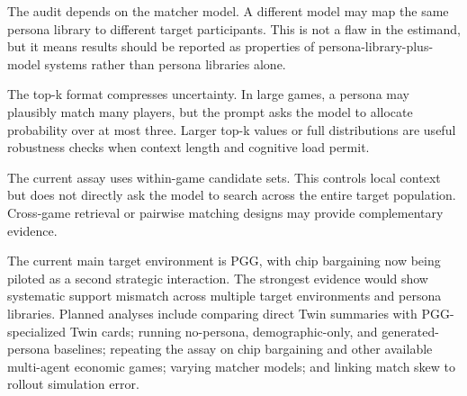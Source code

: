 \documentclass[11pt]{article}
\begin{document}
The audit depends on the matcher model. A different model may map the same persona library to different target participants. This is not a flaw in the estimand, but it means results should be reported as properties of persona-library-plus-model systems rather than persona libraries alone.

The top-k format compresses uncertainty. In large games, a persona may plausibly match many players, but the prompt asks the model to allocate probability over at most three. Larger top-k values or full distributions are useful robustness checks when context length and cognitive load permit.

The current assay uses within-game candidate sets. This controls local context but does not directly ask the model to search across the entire target population. Cross-game retrieval or pairwise matching designs may provide complementary evidence.

The current main target environment is PGG, with chip bargaining now being piloted as a second strategic interaction. The strongest evidence would show systematic support mismatch across multiple target environments and persona libraries. Planned analyses include comparing direct Twin summaries with PGG-specialized Twin cards; running no-persona, demographic-only, and generated-persona baselines; repeating the assay on chip bargaining and other available multi-agent economic games; varying matcher models; and linking match skew to rollout simulation error.
\end{document}
